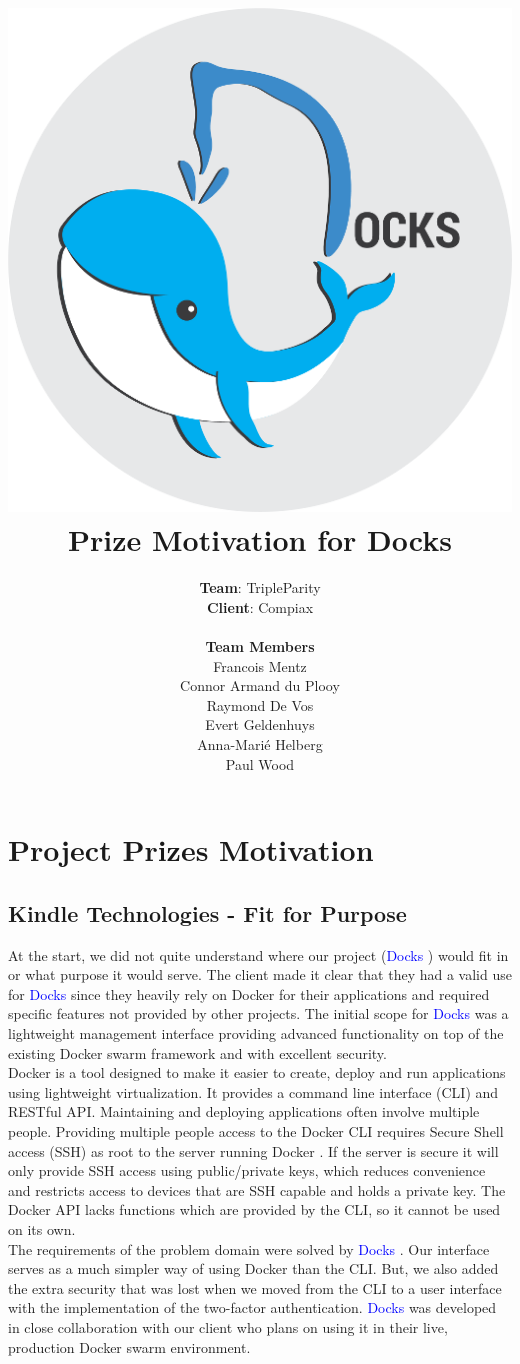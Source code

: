 \documentclass[]{article}
\title{
	\vspace{-1.5cm}
	\includegraphics[scale=0.7]{docks_round_512.png}
	\\[1cm]
	Prize Motivation for Docks}
\author{\textbf{Team}: TripleParity\\
\textbf{Client}: Compiax\\
\\
\textbf{Team Members}\\
Francois Mentz\\
Connor Armand du Plooy\\
Raymond De Vos\\
Evert Geldenhuys\\
Anna-Marié Helberg\\
Paul Wood}
\date{}
\newcommand{\docks}{\textcolor{Blue}{Docks} }
\newcommand{\docker}{Docker }
\begin{document}
\maketitle

\tableofcontents

\pagebreak

\section{Project Prizes Motivation}
\subsection{Kindle Technologies - Fit for Purpose}

At the start, we did not quite understand where our project (\docks) would fit in or what purpose it would serve. The client made it clear that they had a valid use for \docks since they heavily rely on \docker for their applications and required specific features not provided by other projects. The initial scope for \docks was a lightweight management interface providing advanced functionality on top of the existing \docker swarm framework and with excellent security. \\

\docker is a tool designed to make it easier to create, deploy and run applications
using lightweight virtualization. It provides a command line interface (CLI)
and RESTful API. Maintaining and deploying applications often involve multiple
people. Providing multiple people access to the \docker CLI requires
Secure Shell access (SSH) as root to the server running \docker. If the server
is secure it will only provide SSH access using public/private keys, which
reduces convenience and restricts access to devices that are SSH capable and
holds a private key. The \docker API lacks functions which are provided by
the CLI, so it cannot be used on its own. \\

The requirements of the problem domain were solved by \docks. Our interface serves as a much simpler way of using \docker than the CLI. But, we also added the extra security that
was lost when we moved from the CLI to a user interface with the implementation of the two-factor
authentication. \docks was developed in close collaboration with our client who plans on using it in their live, production Docker swarm environment. \\
\end{document}
